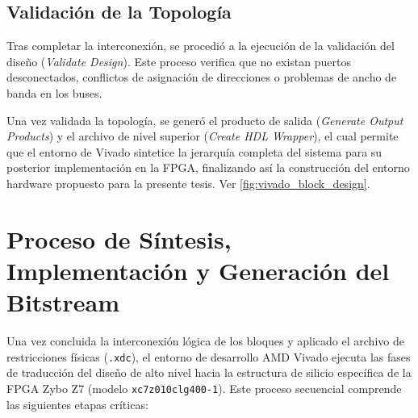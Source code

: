 \subsection{Validación de la Topología}
Tras completar la interconexión, se procedió a la ejecución de la validación del diseño (\textit{Validate Design}). Este proceso verifica que no existan puertos desconectados, conflictos de asignación de direcciones o problemas de ancho de banda en los buses. 

Una vez validada la topología, se generó el producto de salida (\textit{Generate Output Products}) y el archivo de nivel superior (\textit{Create HDL Wrapper}), el cual permite que el entorno de Vivado sintetice la jerarquía completa del sistema para su posterior implementación en la FPGA, finalizando así la construcción del entorno hardware propuesto para la presente tesis. Ver \ref{fig:vivado_block_design}.


\section{Proceso de Síntesis, Implementación y Generación del Bitstream}
Una vez concluida la interconexión lógica de los bloques y aplicado el archivo de restricciones físicas (\texttt{.xdc}), el entorno de desarrollo AMD Vivado ejecuta las fases de traducción del diseño de alto nivel hacia la estructura de silicio específica de la FPGA Zybo Z7 (modelo \texttt{xc7z010clg400-1}). Este proceso secuencial comprende las siguientes etapas críticas:

